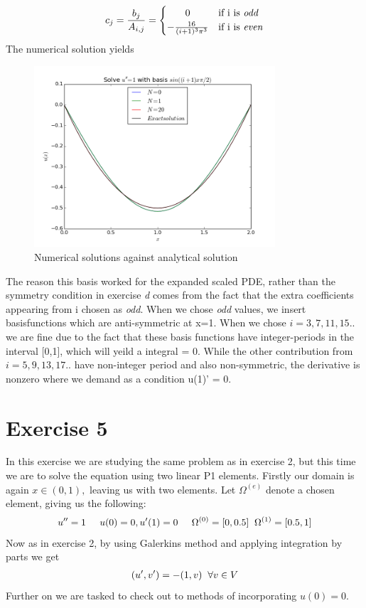 \documentclass[a4paper,norsk]{article}
\begin{document}
\[
  c_j = \frac{b_j}{A_{i,j}} = \left\{\def\arraystretch{1.2}%
  \begin{array}{@{}c@{\quad}l@{}}
    0 & \text{if i is \textit{odd}}\\
    -\frac{16}{(i+1)^3\pi^3} & \text{if i is \textit{even}}\\
  \end{array}\right.
\]
The numerical solution yields
\begin{figure}[h!]
  \caption{Numerical solutions against analytical solution}
  \centering
    \includegraphics[width=0.8\textwidth]{Taske.png}
\end{figure}
The reason this basis worked for the expanded scaled PDE, rather than the symmetry condition in exercise \textit{d} comes from the fact that the extra coefficients appearing from i chosen as \textit{odd}. When we chose \textit{odd} values, we insert basisfunctions which are anti-symmetric at x=1. When we chose $i =3,7,11,15..$ we are fine due to the fact that these basis functions have integer-periods in the interval [0,1], which will yeild a integral = 0. While the other contribution from  $i =5,9,13,17..$ have non-integer period and also non-symmetric, the derivative is nonzero where we demand as a condition u(1)' = 0.


\newpage
\section*{Exercise 5}
In this exercise we are studying the same problem as in exercise 2, but this time we are to solve the equation using two linear P1 elements. Firstly our domain is again $x \in (0,1),$ leaving us with two elements. Let $\Omega^{(e)}$ denote a chosen element, giving us the following:
\begin{align*}
u'' = 1 \hspace{5mm} u(0)=0, u'(1)=0 \hspace{5mm} \Omega^{(0)} = [0, 0.5] \hspace{2mm} \Omega^{(1)} = [0.5,1]
\end{align*}
Now as in exercise 2, by using Galerkins method and applying integration by parts we get
\begin{align*}
(u',v') = -(1,v) \hspace{2mm}\forall v \in V
\end{align*}
Further on we are tasked to check out to methods of incorporating $u(0)=0$.
\end{document}
